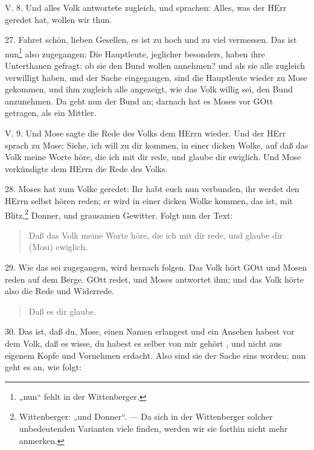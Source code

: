 \begin{schriftzitat}
V. 8. Und alles Volk antwortete zugleich, und sprachen: Alles, was der HErr geredet hat, wollen wir thun.
\end{schriftzitat}

27. Fahret schön, lieben Gesellen, es ist zu hoch und zu viel vermessen. Das ist nun\footnote{„nun“ fehlt in der Wittenberger.} also zugegangen: Die Hauptleute, jeglicher besonders, haben ihre Unterthanen gefragt: ob sie den Bund wollen annehmen? und als sie alle zugleich verwilligt haben, und der Sache eingegangen, sind die Hauptleute wieder zu Mose gekommen, und ihm zugleich alle angezeigt, wie das Volk willig sei, den Bund anzunehmen. Da geht nun der Bund an; darnach hat es Moses vor GOtt getragen, als ein Mittler.

\begin{schriftzitat}
V. 9. Und Mose sagte die Rede des Volks dem HErrn wieder. Und der HErr sprach zu Mose: Siehe, ich will zu dir kommen, in einer dicken Wolke, auf daß das Volk meine Worte höre, die ich mit dir rede, und glaube dir ewiglich. Und Mose verkündigte dem HErrn die Rede des Volks.
\end{schriftzitat}

28. Moses hat zum Volke geredet: Ihr habt euch nun verbunden, ihr werdet den HErrn selbst hören reden; er wird in einer dicken Wolke kommen, das ist, mit Blitz,\footnote{Wittenberger: „und Donner“. — Da sich in der Wittenberger solcher unbedeutenden Varianten viele finden, werden wir sie forthin nicht mehr anmerken.} Donner, und grausamen Gewitter. Folgt nun der Text:

\begin{quote}
Daß das Volk meine Worte höre, die ich mit dir rede, und glaube dir (Mosi) ewiglich.
\end{quote}

29. Wie das sei zugegangen, wird hernach folgen. Das Volk hört GOtt und Mosen reden auf dem Berge. GOtt redet, und Moses antwortet ihm; und das Volk hörte also die Rede und Widerrede.

\begin{quote}
Daß es dir glaube.
\end{quote}

30. Das ist, daß du, Mose, einen Namen erlangest und ein Ansehen habest vor dem Volk, daß es wisse, du habest es selber von mir gehört
, und nicht aus eigenem Kopfe und Vornehmen erdacht. Also sind sie der Sache eins worden; nun geht es an, wie folgt:

